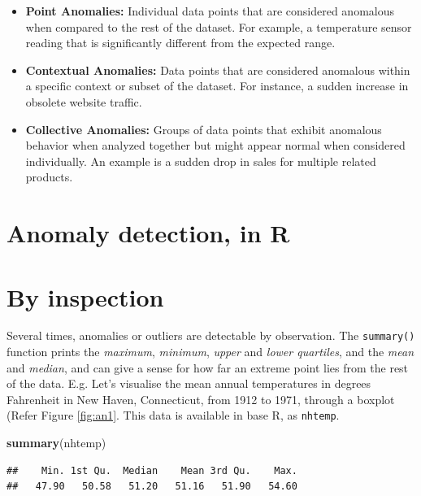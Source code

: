 \documentclass[
]{book}
\newenvironment{Shaded}{\begin{snugshade}}{\end{snugshade}}
\newcommand{\FunctionTok}[1]{\textcolor[rgb]{0.13,0.29,0.53}{\textbf{#1}}}
\newcommand{\NormalTok}[1]{#1}
\begin{document}
\begin{itemize}
\item
  \textbf{Point Anomalies:} Individual data points that are considered anomalous when compared to the rest of the dataset. For example, a temperature sensor reading that is significantly different from the expected range.
\item
  \textbf{Contextual Anomalies:} Data points that are considered anomalous within a specific context or subset of the dataset. For instance, a sudden increase in obsolete website traffic.
\item
  \textbf{Collective Anomalies:} Groups of data points that exhibit anomalous behavior when analyzed together but might appear normal when considered individually. An example is a sudden drop in sales for multiple related products.
\end{itemize}

\hypertarget{anomaly-detection-in-r}{%
\section*{Anomaly detection, in R}\label{anomaly-detection-in-r}}

\hypertarget{by-inspection}{%
\section{By inspection}\label{by-inspection}}

Several times, anomalies or outliers are detectable by observation. The \texttt{summary()} function prints the \emph{maximum}, \emph{minimum}, \emph{upper} and \emph{lower quartiles}, and the \emph{mean} and \emph{median}, and can give a sense for how far an extreme point lies from the rest of the data. E.g. Let's visualise the mean annual temperatures in degrees Fahrenheit in New Haven, Connecticut, from 1912 to 1971, through a boxplot (Refer Figure \ref{fig:an1}. This data is available in base R, as \texttt{nhtemp}.

\begin{Shaded}
\begin{Highlighting}[]
\FunctionTok{summary}\NormalTok{(nhtemp)}
\end{Highlighting}
\end{Shaded}

\begin{verbatim}
##    Min. 1st Qu.  Median    Mean 3rd Qu.    Max. 
##   47.90   50.58   51.20   51.16   51.90   54.60
\end{verbatim}
\end{document}
